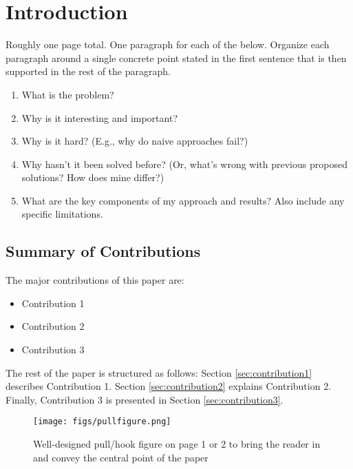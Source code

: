 \section{Introduction}
\label{introduction}


Roughly one page total. One paragraph for each of the below. Organize each paragraph around a single concrete point stated in the first sentence that is then supported in the rest of the paragraph.

\begin{enumerate}
\item What is the problem?
\item Why is it interesting and important?
\item Why is it hard? (E.g., why do naive approaches fail?)
\item Why hasn't it been solved before? (Or, what's wrong with previous proposed solutions? How does mine differ?)
\item What are the key components of my approach and results? Also include any specific limitations.
\end{enumerate}

\subsection{Summary of Contributions}
\label{contributionsummary}

The major contributions of this paper are:

\begin{itemize}
    \item Contribution 1
    \item Contribution 2
    \item Contribution 3
\end{itemize}

The rest of the paper is structured as follows: Section \ref{sec:contribution1} describes Contribution 1. Section \ref{sec:contribution2} explains Contribution 2. Finally, Contribution 3 is presented in Section \ref{sec:contribution3}.

\begin{figure}[h]
\centering
\begin{minipage}{0.55\linewidth}
    \centering
    \texttt{[image: figs/pullfigure.png]} 
\end{minipage}
\caption{Well-designed pull/hook figure on page 1 or 2 to bring the reader in and convey the central point of the paper}
\label{fig:system}
\end{figure}